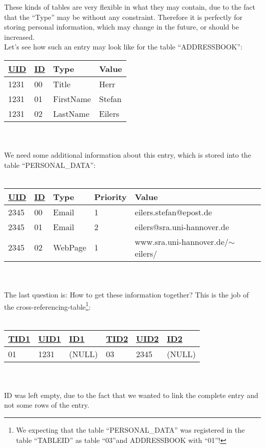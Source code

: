 These kinds of tables are very flexible in what they may contain, due to the fact that the ``Type'' may be without any constraint. Therefore it is perfectly for storing personal information, which may change in the future, or should be increased.
\\
Let's see how such an entry may look like for the table ``ADDRESSBOOK'':

\begin{tabular}[ht]{|l|l|l|l|}
\hline
\underline{UID} & \underline{ID} & Type & Value\\
\hline
 1231& 00& Title& Herr\\
\hline
 1231& 01& FirstName& Stefan\\
\hline
 1231& 02& LastName& Eilers\\
\hline
\end{tabular}
\\
\\
We need some additional information about this entry, which is stored into the table ``PERSONAL\_DATA'':
\\
\\
\begin{tabular}[ht]{|l|l|l|l|l|}
\hline
\underline{UID} & \underline{ID} & Type & Priority & Value\\
\hline
 2345& 00& Email& 1& eilers.stefan@epost.de\\
\hline
 2345& 01& Email& 2& eilers@sra.uni-hannover.de\\
\hline
 2345& 02& WebPage& 1&  www.sra.uni-hannover.de/$\sim$eilers/\\
\hline
\end{tabular}
\\
\\
The last question is: How to get these information together? This is the job of the cross-referencing-table\footnote{We expecting that the table ``PERSONAL\_DATA'' was registered in the table ``TABLEID'' as table ``03''and ADDRESSBOOK with ``01''!}:
\\
\\
\begin{tabular}[ht]{|l|l|l|l|l|l|}
\hline
\underline{TID1} & \underline{UID1} & \underline{ID1} & \underline{TID2} & \underline{UID2} & \underline{ID2} \\
\hline
 01& 1231& (NULL) & 03& 2345& (NULL) \\
\hline
\end{tabular}
\\
\\
ID was left empty, due to the fact that we wanted to link the complete entry and not some rows of the entry.
